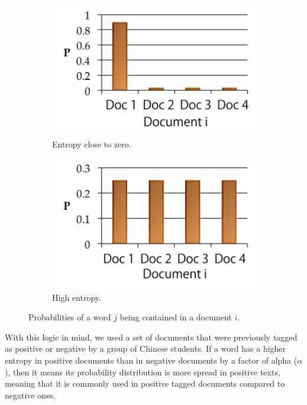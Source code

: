 \documentclass[review]{elsarticle}
\begin{document}
\begin{figure}[h]
    \centering
    \begin{subfigure}[b]{0.4\linewidth}
        \includegraphics[width=\linewidth]{entropyzero.png}
        \caption{Entropy close to zero.}
    \end{subfigure}
    \begin{subfigure}[b]{0.4\linewidth}
        \includegraphics[width=\linewidth]{entropyhigh.png}
        \caption{High entropy.}
    \end{subfigure}
\caption{Probabilities of a word \(j\) being contained in a document \(i\).}
\label{fig:entropygraphs}
\end{figure}

With this logic in mind, we used a set of documents that were previously tagged as positive or negative by a group of Chinese students. If a word has a higher entropy in positive documents than in negative documents by a factor of alpha (\(\alpha\)), then it means its probability distribution is more spread in positive texts, meaning that it is commonly used in positive tagged documents compared to negative ones.
\end{document}
